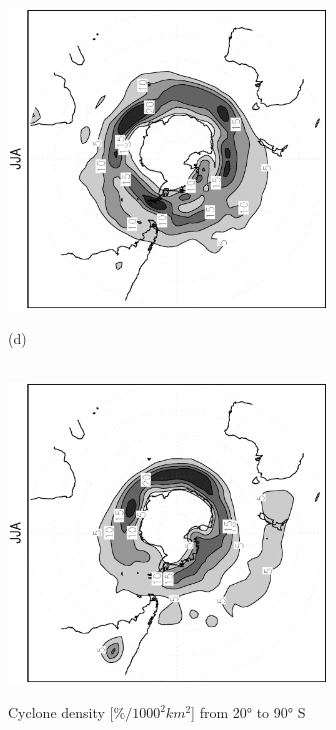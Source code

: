 \documentclass[12pt,a4paper,twoside,openright,headinclude,liststotoc,bibtotoc]{scrreprt}
\begin{document}
\begin{figure}[b]
{\includegraphics[height=8.0cm,angle=-90]
{eps/cycldensity_PLASIM_T21_45JJA_SH.eps}
}
\parbox{8.5cm}{\hspace{0.95cm}\begin{scriptsize}(d)\end{scriptsize} \vspace{-0.5cm} \\
\includegraphics[height=8.0cm,angle=-90]
{eps/cycldensity_ERA40_T21_45JJA_SH.eps}
}
\caption[Cyclone density Southern Hemisphere]{Cyclone density [$\%/1000^2 km^2$] from 20° to 90° S}
\label{img:SHcyclden}
\end{figure}
\end{document}
